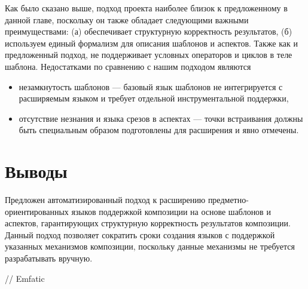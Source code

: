 Как было сказано выше, подход проекта  \cite{Reuseware} наиболее близок к предложенному в данной главе, поскольку он также обладает следующими важными преимуществами:
(а) обеспечивает структурную корректность результатов, (б) используем единый формализм для описания шаблонов и аспектов. Также как и предложенный подход,  не поддерживает условных операторов и циклов в теле шаблона. Недостатками  по сравнению с нашим подходом являются 
\begin{itemize}
\item незамкнутость шаблонов --- базовый язык шаблонов не интегрируется с расширяемым языком и требует отдельной инструментальной поддержки,
\item отсутствие незнания и языка срезов в аспектах --- точки встраивания должны быть специальным образом подготовлены для расширения и явно отмечены.
\end{itemize}

\chapter{Выводы}

Предложен автоматизированный подход к расширению предметно-ориентированных языков поддержкой композиции на основе шаблонов и аспектов, гарантирующих структурную корректность результатов композиции. Данный подход позволяет сократить сроки создания языков с поддержкой указанных механизмов композиции, поскольку данные механизмы не требуется разрабатывать вручную.

// Emfatic